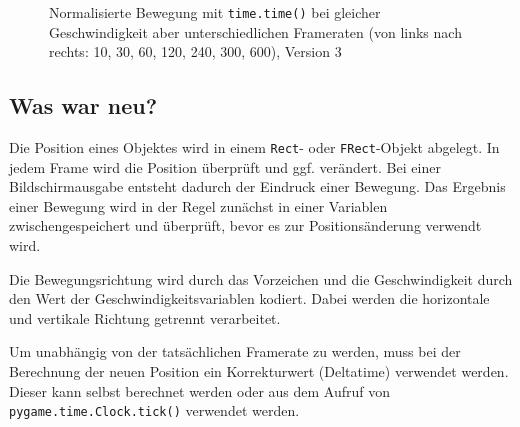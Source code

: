 \begin{figure}[p] 
	\begin{center}
		\caption[Normalisierte Bewegung mit \texttt{time.time()}]{Normalisierte Bewegung mit \texttt{time.time()} bei gleicher Geschwindigkeit aber unterschiedlichen Frameraten (von links nach rechts: 10, 30, 60, 120, 240, 300, 600), Version 3}\label{fpsbewegung04}%
	\end{center}
\end{figure}
\newpage



\subsection*{Was war neu?}
Die Position eines Objektes wird in einem \texttt{Rect}- oder \texttt{FRect}-Objekt abgelegt. In jedem Frame wird die Position überprüft und ggf. verändert. Bei einer Bildschirmausgabe entsteht dadurch der Eindruck einer Bewegung. Das Ergebnis einer Bewegung wird in der Regel zunächst in einer Variablen zwischengespeichert und überprüft, bevor es zur Positionsänderung verwendt wird.

Die Bewegungsrichtung wird durch das Vorzeichen und die Geschwindigkeit durch den Wert der Geschwindigkeitsvariablen kodiert. Dabei werden die horizontale und vertikale Richtung getrennt verarbeitet.

Um unabhängig von der tatsächlichen Framerate zu werden, muss bei der Berechnung der neuen Position ein Korrekturwert (Deltatime) verwendet werden. Dieser kann selbst berechnet werden oder aus dem Aufruf von \texttt{pygame.time.Clock.tick()} verwendet werden.

